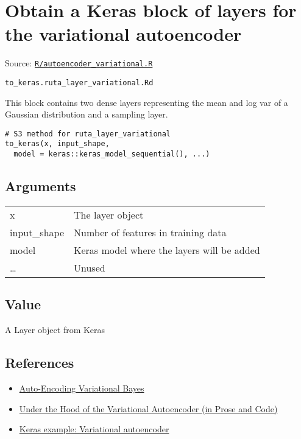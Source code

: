 \section{Obtain a Keras block of layers for the variational
autoencoder}\label{obtain-a-keras-block-of-layers-for-the-variational-autoencoder}

Source:
\href{https://github.com/fdavidcl/ruta/blob/master/R/autoencoder_variational.R}{\texttt{R/autoencoder\_variational.R}}

\texttt{to\_keras.ruta\_layer\_variational.Rd}

This block contains two dense layers representing the mean and log var
of a Gaussian distribution and a sampling layer.

\begin{verbatim}
# S3 method for ruta_layer_variational
to_keras(x, input_shape,
  model = keras::keras_model_sequential(), ...)
\end{verbatim}

\hypertarget{arguments}{\subsection{\texorpdfstring{\protect\hyperlink{arguments}{}Arguments}{Arguments}}\label{arguments}}

\begin{longtable}[c]{@{}>{\small}p{3cm}>{\raggedright}p{12.5cm}@{}}
\toprule
x & The layer object\tabularnewline
input\_shape & Number of features in training data\tabularnewline
model & Keras model where the layers will be added\tabularnewline
\ldots{} & Unused\tabularnewline
\bottomrule
\end{longtable}

\hypertarget{value}{\subsection{\texorpdfstring{\protect\hyperlink{value}{}Value}{Value}}\label{value}}

A Layer object from Keras

\hypertarget{references}{\subsection{\texorpdfstring{\protect\hyperlink{references}{}References}{References}}\label{references}}

\begin{itemize}
\item
  \href{https://arxiv.org/abs/1312.6114}{Auto-Encoding Variational
  Bayes}
\item
  \href{http://blog.fastforwardlabs.com/2016/08/22/under-the-hood-of-the-variational-autoencoder-in.html}{Under
  the Hood of the Variational Autoencoder (in Prose and Code)}
\item
  \href{https://keras.rstudio.com/articles/examples/variational_autoencoder.html}{Keras
  example: Variational autoencoder}
\end{itemize}

